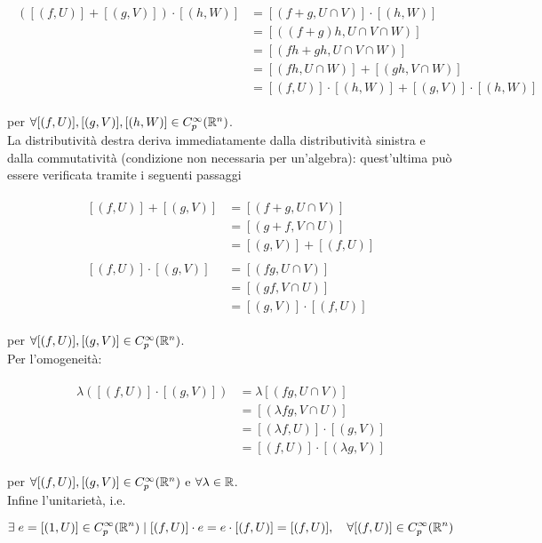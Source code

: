 \begin{align}
	\begin{split}
		([(f,U)] + [(g,V)]) \cdot [(h,W)] &= [(f+g,U \cap V)] \cdot [(h,W)]\\
		&= [((f+g) h,U \cap V \cap W)]\\
		&= [(fh + gh,U \cap V \cap W)]\\
		&= [(fh,U \cap W)] + [(gh,V \cap W)]\\
		&= [(f,U)] \cdot [(h,W)] + [(g,V)] \cdot [(h,W)]
	\end{split}
\end{align}

per $ \forall [(f,U)], [(g,V)], [(h,W)] \in C_{p}^{\infty}(\mathbb{R}^{n}) $.\\
La distributività destra deriva immediatamente dalla distributività sinistra e dalla commutatività (condizione non necessaria per un'algebra): quest'ultima può essere verificata tramite i seguenti passaggi

\begin{align}
	\begin{split}
		[(f,U)] + [(g,V)] &= [(f+g,U \cap V)]\\
		&= [(g+f,V \cap U)]\\
		&= [(g,V)] + [(f,U)]\\\\
		[(f,U)] \cdot [(g,V)] &= [(fg,U \cap V)]\\
		&= [(gf,V \cap U)]\\
		&= [(g,V)] \cdot [(f,U)]
	\end{split}
\end{align}

per $ \forall [(f,U)], [(g,V)] \in C_{p}^{\infty}(\mathbb{R}^{n}) $.\\
Per l'omogeneità:

\begin{align}
	\begin{split}
		\lambda ([(f,U)] \cdot [(g,V)]) &= \lambda [(fg,U \cap V)]\\
		&= [(\lambda fg,V \cap U)]\\
		&= [(\lambda f,U)] \cdot [(g,V)]\\
		&= [(f,U)] \cdot [(\lambda g,V)]
	\end{split}
\end{align}

per $ \forall [(f,U)], [(g,V)] \in C_{p}^{\infty}(\mathbb{R}^{n}) $ e $ \forall \lambda \in \mathbb{R} $.\\
Infine l'unitarietà, i.e.

\begin{equation}
	\E e = [(1,U)] \in C_{p}^{\infty}(\R^{n}) \mid [(f,U)] \cdot e = e \cdot [(f,U)] = [(f,U)] \qcomma \forall [(f,U)] \in C_{p}^{\infty}(\R^{n})
\end{equation}

